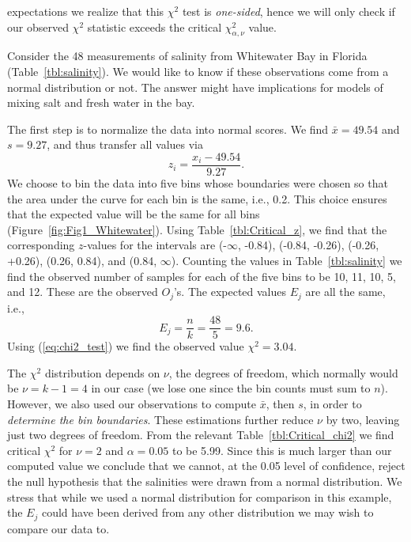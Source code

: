 expectations we realize that this $\chi^2$ test is \emph{one-sided}, hence we will only check if our observed $\chi^2$
statistic exceeds the critical $\chi^2_{\alpha, \nu}$ value.
\begin{example}
Consider the 48 measurements of salinity from Whitewater Bay in Florida (Table~\ref{tbl:salinity}). We would like to
know if these observations come from a normal distribution or not.  The 
answer might have implications for models of mixing salt and fresh water in the bay.

	The first step is to normalize the data into normal scores.  We find $\bar{x}  = 49.54$ and $s = 9.27$, and
thus transfer all values via
\begin{equation}
z_i = \frac{x_i - 49.54}{9.27}.
\end{equation}	 
We choose to bin the data into five bins whose boundaries were chosen so that the area under the curve for each bin is the 
same, i.e., 0.2.  This choice ensures that the expected value will be the same for all bins (Figure~\ref{fig:Fig1_Whitewater}).
Using Table~\ref{tbl:Critical_z}, we find that the corresponding $z$-values 
for the intervals are (-$\infty$, -0.84), (-0.84, -0.26), (-0.26, +0.26), (0.26, 0.84), and (0.84, $\infty$).  Counting 
the values in Table~\ref{tbl:salinity} we find the observed number of samples for each of the five bins to be 10, 11, 
10, 5, and 12.  These are the observed $O_j$'s.  The expected values $E_j$ are all the same, i.e.,
\begin{equation}
E_j = \frac{n}{k} = \frac{48}{5} = 9.6.
\end{equation}
Using (\ref{eq:chi2_test}) we find the observed value $\chi^2 = 3.04$.

	The $\chi^2$ distribution depends on $\nu$, the degrees of freedom, which normally would be 
$\nu = k - 1 = 4$ in 
our case (we lose one since the bin counts must sum to $n$).  However, we also used our observations to
compute $\bar{x}$, then $s$, in order to \emph{determine the bin boundaries}.  These estimations further reduce $\nu$ by two, leaving 
just two degrees of freedom.  From the relevant Table~\ref{tbl:Critical_chi2} we find critical $\chi^2$ for $\nu = 2$ and $\alpha = 0.05$ to be 
5.99.  Since this is much larger than our computed value we conclude that we cannot, at the 0.05 level of confidence, reject the 
null hypothesis that the salinities were drawn from a normal distribution. 
We stress that while we used a normal distribution for comparison in this example, the $E_j$ could have 
been derived from any other distribution we may wish to compare our data to. 
\end{example}

